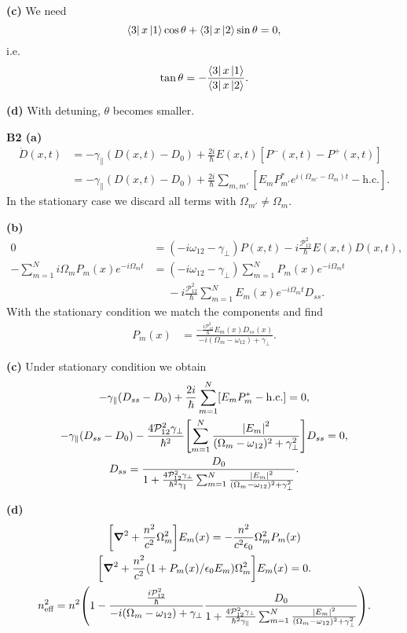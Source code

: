 \documentclass{article}
\makeatletter
\newcommand*{\shifttext}[1]{%
  \settowidth{\@tempdima}{#1}%
  \hspace{-\@tempdima}#1%
}
\newcommand{\plabel}[1]{%
\shifttext{\textbf{#1}\quad}%
}
\newcommand{\prule}{%
\begin{center}%
\hdashrule[0.5ex]{.99\linewidth}{1pt}{1pt 2.5pt}%
\end{center}%
}
\newcommand{\minusbaseline}{\abovedisplayskip=0pt\abovedisplayshortskip=0pt~\vspace*{-\baselineskip}}%
\makeatother
\begin{document}
\plabel{(c)}%
We need
\[ \bra{3} x \ket{1} \cos\theta + \bra{3} x \ket{2} \sin\theta = 0, \]
i.e.
\[ \tan\theta = -\frac{\bra{3}x\ket{1}}{\bra{3}x\ket{2}}. \]

\plabel{(d)}%
With detuning, $\theta$ becomes smaller.

\prule

\plabel{B2 (a)}%
\begingroup\minusbaseline
\begin{align*}
\dot{D}(x,t) &= -\gamma_{\parallel} (D(x,t) - D_0) + \frac{2i}{\hbar} E(x,t) [P^{-}(x,t) - P^{+}(x,t)]\\
&=-\gamma_{\parallel} (D(x,t) - D_0) + \frac{2i}{\hbar} \sum_{m,m'} [E_m P^*_{m'} e^{i(\Omega_{m'}-\Omega_m) t} - \mathrm{h.c.}].
\end{align*}
\endgroup
In the stationary case we discard all terms with $\Omega_{m'}\neq \Omega_m$.

\plabel{(b)}%
\begingroup\minusbaseline
\begin{align*}
0 &= (-i\omega_{12} - \gamma_{\perp} )P(x,t) - i\frac{\mathcal{P}_{12}^2}{\hbar}E(x,t)D(x,t), \\
-\sum_{m=1}^N i\Omega_m P_m(x) e^{-i\Omega_m t} &=(-i \omega_{12} - \gamma_{\perp})\sum_{m=1}^N P_m(x)e^{-i\Omega_m t} \\
&{\phantom{{}={}}} -i\frac{\mathcal{P}_{12}^2}{\hbar} \sum_{m=1}^{N} E_m(x) e^{-i\Omega_m t}D_{ss}.
\end{align*}
\endgroup
With the stationary condition we match the components and find
\begin{align*}
P_m(x) &= \frac{-\frac{i\mathcal{P}_{12}^2}{\hbar}E_m(x)D_{ss}(x)}{-i(\Omega_m - \omega_{12}) + \gamma_{\perp} }.
\end{align*}

\plabel{(c)}%
Under stationary condition we obtain
\begin{gather*}
-\gamma_{\parallel} (D_{ss} - D_0) + \frac{2i}{\hbar} \sum_{m=1}^N [E_m P^*_{m} - \mathrm{h.c.}] = 0, \\
-\gamma_{\parallel} (D_{ss} - D_0) - \frac{4\mathcal{P}_{12}^2 \gamma_{\perp}}{\hbar^2}\qty[\sum_{m=1}^N \frac{\abs{E_m}^2}{(\Omega_{m}-\omega_{12})^2 + \gamma_{\perp}^2}]D_{ss} = 0, \\
D_{ss} = \frac{D_0}{1 + \frac{4\mathcal{P}_{12}^2 \gamma_{\perp}}{\hbar^2 \gamma_{\parallel}}\sum_{m=1}^N \frac{\abs{E_m}^2}{(\Omega_{m}-\omega_{12})^2 + \gamma_{\perp}^2}}.
\end{gather*}

\plabel{(d)}%
\begingroup\minusbaseline
\begin{gather*}
    \qty[\grad^2 + \frac{n^2}{c^2}\Omega_m^2] E_m(x) = -\frac{n^2}{c^2 \epsilon_0}\Omega_m^2 P_m(x) \\
    \qty[\grad^2 + \frac{n^2}{c^2}\qty(1+ P_m(x)/\epsilon_0E_m) \Omega_m^2]E_m(x) = 0.\\
    n_{\text{eff}}^2 = n^2\qty(1- \frac{\frac{i\mathcal{P}_{12}^2}{\hbar}}{-i(\Omega_m - \omega_{12}) +\gamma_{\perp} }\frac{D_0}{1 + \frac{4\mathcal{P}_{12}^2 \gamma_{\perp}}{\hbar^2 \gamma_{\parallel}}\sum_{m=1}^N \frac{\abs{E_m}^2}{(\Omega_{m}-\omega_{12})^2 + \gamma_{\perp}^2}}).
\end{gather*}
\endgroup
\end{document}
